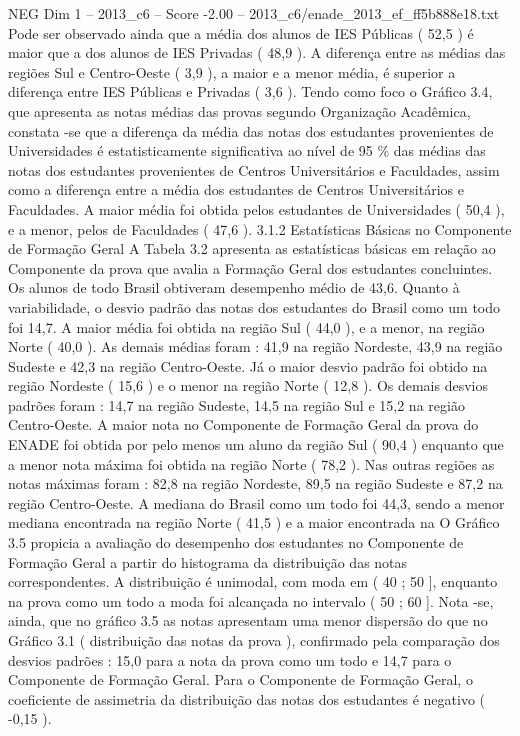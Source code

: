 \begin{textsample}{NEG Dim 1 – 2013\_c6 – Score -2.00 – 2013\_c6/enade\_2013\_ef\_ff5b888e18.txt}
Pode ser observado ainda que a média dos alunos de IES Públicas ( 52,5 ) é maior que a dos alunos de IES Privadas ( 48,9 ).
A diferença entre as médias das regiões Sul e Centro-Oeste ( 3,9 ), a maior e a menor média, é superior a diferença entre IES Públicas e Privadas ( 3,6 ).
Tendo como foco o Gráfico 3.4, que apresenta as notas médias das provas segundo Organização Acadêmica, constata -se que a diferença da média das notas dos estudantes provenientes de Universidades é estatisticamente significativa ao nível de 95 \% das médias das notas dos estudantes provenientes de Centros Universitários e Faculdades, assim como a diferença entre a média dos estudantes de Centros Universitários e Faculdades.
A maior média foi obtida pelos estudantes de Universidades ( 50,4 ), e a menor, pelos de Faculdades ( 47,6 ). 3.1.2 Estatísticas Básicas no Componente de Formação Geral A Tabela 3.2 apresenta as estatísticas básicas em relação ao Componente da prova que avalia a Formação Geral dos estudantes concluintes.
Os alunos de todo Brasil obtiveram desempenho médio de 43,6.
Quanto à variabilidade, o desvio padrão das notas dos estudantes do Brasil como um todo foi 14,7.
A maior média foi obtida na região Sul ( 44,0 ), e a menor, na região Norte ( 40,0 ).
As demais médias foram : 41,9 na região Nordeste, 43,9 na região Sudeste e 42,3 na região Centro-Oeste.
Já o maior desvio padrão foi obtido na região Nordeste ( 15,6 ) e o menor na região Norte ( 12,8 ).
Os demais desvios padrões foram : 14,7 na região Sudeste, 14,5 na região Sul e 15,2 na região Centro-Oeste.
A maior nota no Componente de Formação Geral da prova do ENADE foi obtida por pelo menos um aluno da região Sul ( 90,4 ) enquanto que a menor nota máxima foi obtida na região Norte ( 78,2 ).
Nas outras regiões as notas máximas foram : 82,8 na região Nordeste, 89,5 na região Sudeste e 87,2 na região Centro-Oeste.
A mediana do Brasil como um todo foi 44,3, sendo a menor mediana encontrada na região Norte ( 41,5 ) e a maior encontrada na O Gráfico 3.5 propicia a avaliação do desempenho dos estudantes no Componente de Formação Geral a partir do histograma da distribuição das notas correspondentes.
A distribuição é unimodal, com moda em ( 40 ; 50 ], enquanto na prova como um todo a moda foi alcançada no intervalo ( 50 ; 60 ].
Nota -se, ainda, que no gráfico 3.5 as notas apresentam uma menor dispersão do que no Gráfico 3.1 ( distribuição das notas da prova ), confirmado pela comparação dos desvios padrões : 15,0 para a nota da prova como um todo e 14,7 para o Componente de Formação Geral.
Para o Componente de Formação Geral, o coeficiente de assimetria da distribuição das notas dos estudantes é negativo ( -0,15 ).

\end{textsample}
